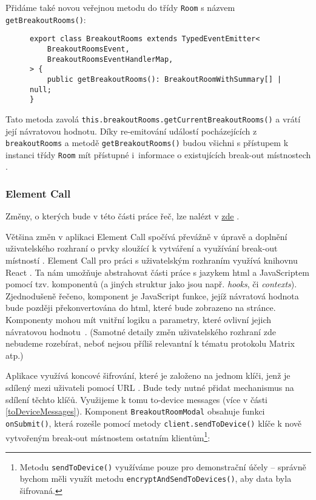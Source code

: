 Přidáme také
novou veřejnou metodu do třídy \texttt{Room} s názvem
\texttt{getBreakoutRooms()}:

\begin{figure}[H]
    \begin{verbatim}
export class BreakoutRooms extends TypedEventEmitter<
	BreakoutRoomsEvent,
	BreakoutRoomsEventHandlerMap,
> {
	public getBreakoutRooms(): BreakoutRoomWithSummary[] | null;
}
	\end{verbatim}
\end{figure}

Tato metoda zavolá
\texttt{this.breakoutRooms.getCurrentBreakoutRooms()} a vrátí
její návratovou hodnotu. Díky re-emitování událostí pocházejících z
\texttt{breakoutRooms} a metodě
\texttt{getBreakoutRooms()} budou všichni s přístupem k instanci
třídy \texttt{Room} mít přístupné i~informace o existujících
break-out místnostech \parencite{GitHub-MatrixJSSDK-BreakoutRooms}.

\subsubsection{Element Call}

Změny, o kterých bude v této části práce řeč, lze nalézt v
\href{https://github.com/vector-im/element-call/pull/1615/}{zde}
\parencite{GitHub-ElementCall-BreakoutRooms}.

Většina změn v aplikaci Element Call spočívá převážně v úpravě a doplnění
uživatelského rozhraní o prvky sloužící k vytváření a využívání break-out
místností \parencite{GitHub-ElementCall-BreakoutRooms}. Element Call pro práci s
uživatelským rozhraním využívá knihovnu React \parencite{GitHub-ElementCall}. Ta
nám umožňuje abstrahovat části práce s jazykem \gls{html} a JavaScriptem pomocí
tzv. komponentů (a jiných struktur jako jsou např. \textit{hooks}, či
\textit{contexts}). Zjednodušeně řečeno, komponent je JavaScript funkce, jejíž
návratová hodnota bude později překonvertována do \gls{html}, které bude
zobrazeno na stránce. Komponenty mohou mít vnitřní logiku a parametry, které
ovlivní jejich návratovou hodnotu~\parencite{React-Homepage}. (Samotné detaily
změn uživatelského rozhraní zde nebudeme rozebírat, neboť nejsou příliš
relevantní k tématu protokolu Matrix atp.)

Aplikace využívá koncové šifrování, které je založeno na jednom klíči, jenž je
sdílený mezi uživateli pomocí URL
\parencite{GitHub-ElementCall-CompleteSPAE2EEWork}. Bude tedy nutné přidat
mechanismus na sdílení těchto klíčů. Využijeme k tomu to-device messages (více v
části \ref{toDeviceMessages}). Komponent
\texttt{BreakoutRoomModal} obsahuje funkci
\texttt{onSubmit()}, která rozešle pomocí metody
\texttt{client.sendToDevice()} klíče k nově vytvořeným break-out
místnostem ostatním klientům\footnote{Metodu
    \texttt{sendToDevice()} využíváme pouze pro demonstrační účely
    -- správně bychom měli využít metodu
    \texttt{encryptAndSendToDevices()}, aby data byla šifrovaná.}:

